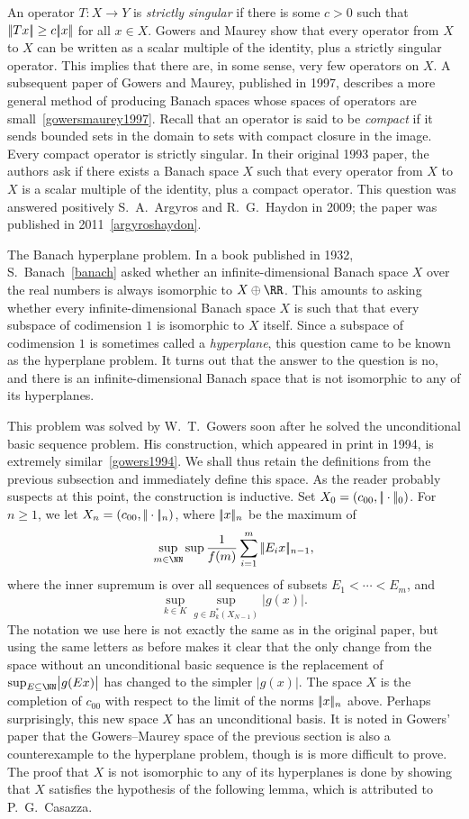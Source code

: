 An operator $T:X\to Y$ is {\it strictly singular} if there is some $c>0$ such that $|\!|Tx|\!| \ge c|\!|x|\!|$ for
all $x\in X$. Gowers and Maurey show that every operator from
$X$ to $X$ can be written as a scalar multiple of the identity, plus a strictly singular operator. This
implies that there are, in some sense, very few operators on $X$. A subsequent paper of Gowers and Maurey,
published in 1997,
describes a more general method of producing
Banach spaces whose spaces of operators are small~\ref{gowersmaurey1997}. Recall that an operator
is said to be {\it compact} if it sends bounded sets in the domain to sets with compact closure in the image.
Every compact operator is strictly singular.
In their original
1993 paper, the authors ask if there exists a Banach space $X$ such that every operator from $X$ to $X$
is a scalar multiple of the identity, plus a compact operator. This question was answered positively
S.~A.~Argyros and R.~G.~Haydon in 2009; the paper was published in 2011~\ref{argyroshaydon}.

\medskip\boldlabel The Banach hyperplane problem. In a book published in 1932,
S.~Banach~\ref{banach} asked whether an infinite-dimensional Banach space $X$ over the real
numbers is always isomorphic to $X\oplus \RR$. This amounts to asking whether every infinite-dimensional
Banach space $X$ is such that
that every subspace of codimension $1$ is isomorphic to $X$ itself. Since a subspace of codimension $1$ is
sometimes called a {\it hyperplane}, this question came to be known as the hyperplane problem.
It turns out that the answer to the question is no, and there is an infinite-dimensional
Banach space that is not isomorphic
to any of its hyperplanes.

This problem was solved by W.~T.~Gowers soon after he solved the unconditional basic sequence problem.
His construction, which appeared in print in 1994, is extremely similar~\ref{gowers1994}.
We shall thus retain the definitions from the previous
subsection and immediately define this space. As the reader probably suspects at this point, the construction
is inductive.
Set $X_0 = (c_{00}, |\!|\cdot|\!|_0)$. For $n\ge 1$, we let $X_n = (c_{00}, |\!|\cdot|\!| _n)$,
where $|\!|x|\!|_n$ be the maximum of
$$\sup_{m\in \NN} \sup {1\over f(m)} \sum_{i=1}^m \norm{E_i x}_{n-1},$$
where the inner supremum is over all sequences of subsets $E_1 < \cdots < E_m$, and
$$\sup_{k\in K} \sup_{g\in B^*_k(X_{N-1})} \bigl|g(x)\bigr|.$$
The notation we use here is not exactly the same as in the original paper, but using the same letters
as before makes it clear that the only change from the space without an unconditional basic sequence
is the replacement of $\sup_{E\subseteq \NN} \bigl|g(Ex)\bigr|$ has changed to the simpler $\bigl|g(x)\bigr|$.
The space $X$ is the completion of $c_{00}$ with respect to the limit of the norms $|\!|x|\!|_n$ above.
Perhaps surprisingly, this new space $X$ has an unconditional basis. It is noted in Gowers' paper
that the Gowers--Maurey
space of the previous section is also a counterexample to the hyperplane problem, though is is
more difficult to prove.
The proof that $X$ is not isomorphic to any of its hyperplanes is done by showing that $X$
satisfies the hypothesis of the following lemma, which is attributed to P.~G.~Casazza.

